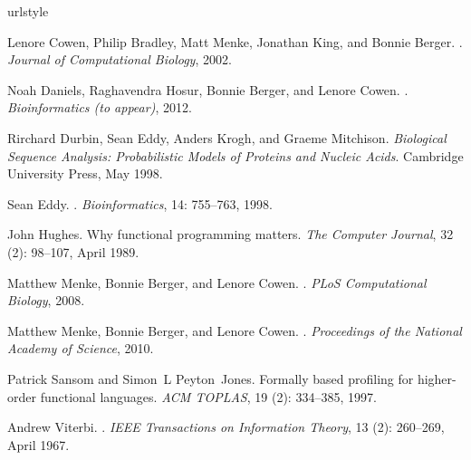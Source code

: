 \documentclass[preprint,nonatbib,blockstyle,times]{sigplanconf}
\begin{document}
\begin{thebibliography}{9}
\providecommand{\natexlab}[1]{#1}
\providecommand{\url}[1]{\texttt{#1}}
\expandafter\ifx\csname urlstyle\endcsname\relax
  \providecommand{\doi}[1]{doi: #1}\else
  \providecommand{\doi}{doi: \begingroup \urlstyle{rm}\Url}\fi

Lenore Cowen, Philip Bradley, Matt Menke, Jonathan King, and Bonnie Berger.
.
\newblock \emph{Journal of Computational Biology}, 2002.

Noah Daniels, Raghavendra Hosur, Bonnie Berger, and Lenore Cowen.
.
\newblock \emph{Bioinformatics (to appear)}, 2012.

Rirchard Durbin, Sean Eddy, Anders Krogh, and Graeme Mitchison.
\newblock \emph{{Biological Sequence Analysis: Probabilistic Models of Proteins
  and Nucleic Acids}}.
\newblock Cambridge University Press, May 1998.

Sean Eddy.
.
\newblock \emph{Bioinformatics}, 14: 755--763, 1998.

John Hughes.
\newblock Why functional programming matters.
\newblock \emph{The Computer Journal}, 32 (2): 98--107, April
  1989.

Matthew Menke, Bonnie Berger, and Lenore Cowen.
.
\newblock \emph{PLoS Computational Biology}, 2008.

Matthew Menke, Bonnie Berger, and Lenore Cowen.
.
\newblock \emph{Proceedings of the National Academy of Science}, 2010.

Patrick Sansom and Simon~L Peyton~Jones.
\newblock Formally based profiling for higher-order functional languages.
\newblock \emph{ACM TOPLAS}, 19 (2): 334--385, 1997.

Andrew Viterbi.
.
\newblock \emph{IEEE Transactions on Information Theory}, 13
  (2): 260--269, April 1967.

\end{thebibliography}
\fi
\end{document}
